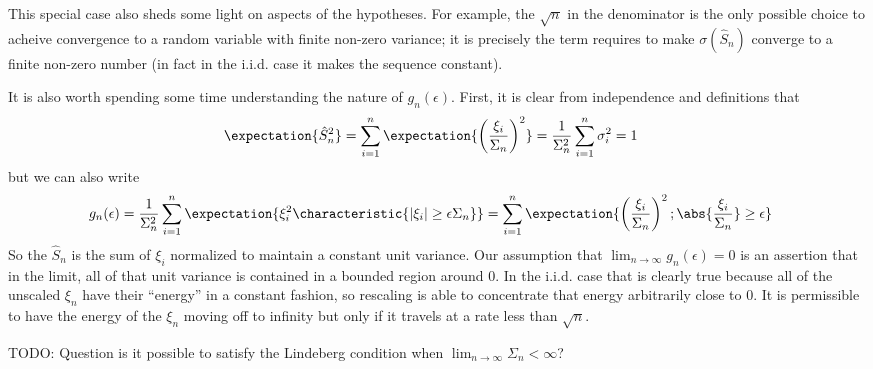 This special case also sheds some light on aspects of the hypotheses.
For example, the $\sqrt{n}$ in the denominator is the only possible
choice to acheive convergence to a random variable with finite
non-zero variance; it is precisely the term requires to make
$\sigma(\hat{S}_n)$ converge to a finite non-zero number (in fact in
the i.i.d. case it makes the sequence constant).  

It is also worth spending some time understanding the nature of
$g_n(\epsilon)$.  First, it is clear from independence and definitions that 
\begin{align*}
\expectation{\hat{S}_n^2} &= \sum_{i=1}^n \expectation{\left
    (\frac{\xi_i}{\Sigma_n} \right )^2} = \frac{1}{\Sigma_n^2}
\sum_{i=1}^n \sigma_i^2 = 1
\end{align*}
but we can also write 
\begin{align*}
g_n(\epsilon) &= \frac{1}{\Sigma_n^2} \sum_{i=1}^n \expectation{\xi_i^2
  \characteristic{|\xi_i| \geq \epsilon \Sigma_n}} = \sum_{i=1}^n
\expectation{\left (\frac{\xi_i}{\Sigma_n}\right )^2
  ; \abs{\frac{\xi_i}{\Sigma_n}} \geq \epsilon}
\end{align*}
So the $\hat{S}_n$ is the sum of $\xi_i$ normalized to maintain a
constant unit variance.  Our assumption that $\lim_{n \to \infty}
g_n(\epsilon) = 0$ is an assertion that in the limit, all of that unit
variance is contained in a bounded region around $0$.  In the
i.i.d. case that is clearly true because all of the unscaled $\xi_n$
have their ``energy'' in a constant fashion, so rescaling is able to
concentrate that energy arbitrarily close to $0$.  It is permissible
to have the energy of the $\xi_n$ moving off to infinity but only if
it travels at a rate less than $\sqrt{n}$.

TODO: Question is it possible to satisfy the Lindeberg condition when
$\lim_{n \to \infty} \Sigma_n < \infty$?


